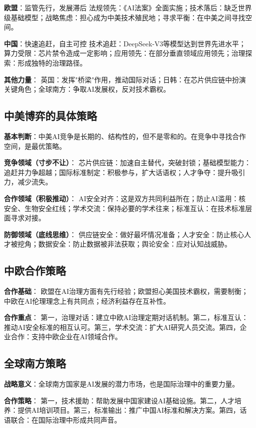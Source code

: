 \textbf{欧盟}：监管先行，发展滞后
法规领先：《AI法案》全面实施；技术落后：缺乏世界级基础模型；战略焦虑：担心成为中美技术殖民地；寻求平衡：在中美之间寻找空间。

\textbf{中国}：快速追赶，自主可控
技术追赶：DeepSeek-V3等模型达到世界先进水平；算力受限：芯片禁令造成一定影响；应用领先：在部分垂直领域应用领先；治理探索：形成独特的治理路径。

\textbf{其他力量}：
英国：发挥"桥梁"作用，推动国际对话；日韩：在芯片供应链中扮演关键角色；全球南方：争取AI发展权，反对技术霸权。

\subsection{中美博弈的具体策略}

\textbf{基本判断}：中美AI竞争是长期的、结构性的，但不是零和的。在竞争中寻找合作空间，是最优策略。

\textbf{竞争领域（寸步不让）}：
芯片供应链：加速自主替代，突破封锁；基础模型能力：追赶并力争超越；国际标准制定：积极参与，扩大话语权；人才争夺：提升吸引力，减少流失。

\textbf{合作领域（积极推动）}：
AI安全对齐：这是双方共同利益所在；防止AI滥用：核安全、生物安全红线；学术交流：保持必要的学术往来；标准互认：在技术标准层面寻求对接。

\textbf{防御领域（底线思维）}：
供应链安全：做好最坏情况准备；人才安全：防止核心人才被挖角；数据安全：防止数据被非法获取；舆论安全：应对认知战威胁。

\subsection{中欧合作策略}

\textbf{合作基础}：
欧盟在AI治理方面有先行经验；欧盟担心美国技术霸权，需要制衡；中欧在AI伦理理念上有共同点；经济利益存在互补性。

\textbf{合作重点}：
第一，治理对话：建立中欧AI治理定期对话机制。第二，标准互认：推动AI安全标准的相互认可。第三，学术交流：扩大AI研究人员交流。第四，企业合作：支持中欧企业在AI领域合作。

\subsection{全球南方策略}

\textbf{战略意义}：全球南方国家是AI发展的潜力市场，也是国际治理中的重要力量。

\textbf{合作策略}：
第一，技术援助：帮助发展中国家建设AI基础设施。第二，人才培养：提供AI培训项目。第三，标准输出：推广中国AI标准和解决方案。第四，话语联合：在国际治理中形成共同声音。

